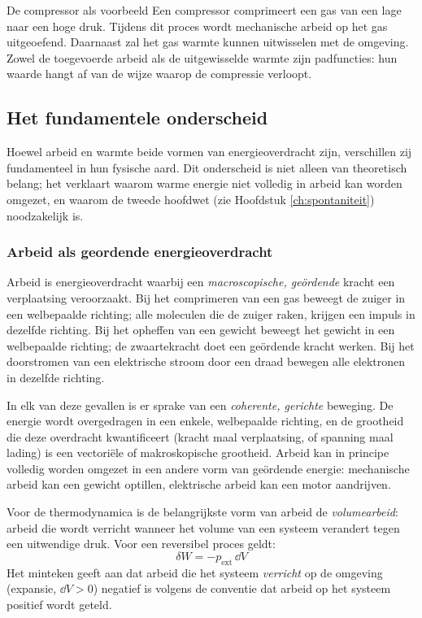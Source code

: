 \begin{toepassing}{De compressor als voorbeeld}
Een compressor comprimeert een gas van een lage naar een hoge druk. Tijdens dit proces wordt mechanische arbeid op het gas uitgeoefend. Daarnaast zal het gas warmte kunnen uitwisselen met de omgeving. Zowel de toegevoerde arbeid als de uitgewisselde warmte zijn padfuncties: hun waarde hangt af van de wijze waarop de compressie verloopt.
\end{toepassing}

\subsection{Het fundamentele onderscheid}

Hoewel arbeid en warmte beide vormen van energieoverdracht zijn, verschillen zij fundamenteel in hun fysische aard. Dit onderscheid is niet alleen van theoretisch belang; het verklaart waarom warme energie niet volledig in arbeid kan worden omgezet, en waarom de tweede hoofdwet (zie Hoofdstuk \ref{ch:spontaniteit}) noodzakelijk is.

\subsubsection{Arbeid als geordende energieoverdracht}

Arbeid is energieoverdracht waarbij een \emph{macroscopische, ge\"ordende} kracht een verplaatsing veroorzaakt. Bij het comprimeren van een gas beweegt de zuiger in een welbepaalde richting; alle moleculen die de zuiger raken, krijgen een impuls in dezelfde richting. Bij het opheffen van een gewicht beweegt het gewicht in een welbepaalde richting; de zwaartekracht doet een ge\"ordende kracht werken. Bij het doorstromen van een elektrische stroom door een draad bewegen alle elektronen in dezelfde richting.

In elk van deze gevallen is er sprake van een \emph{coherente, gerichte} beweging. De energie wordt overgedragen in een enkele, welbepaalde richting, en de grootheid die deze overdracht kwantificeert (kracht maal verplaatsing, of spanning maal lading) is een vectoriële of makroskopische grootheid. Arbeid kan in principe volledig worden omgezet in een andere vorm van ge\"ordende energie: mechanische arbeid kan een gewicht optillen, elektrische arbeid kan een motor aandrijven.

Voor de thermodynamica is de belangrijkste vorm van arbeid de \emph{volumearbeid}: arbeid die wordt verricht wanneer het volume van een systeem verandert tegen een uitwendige druk. Voor een reversibel proces geldt:
\begin{equation}
\boxed{\;\delta W = -p_{\text{ext}}\,\dd V\;}
\end{equation}
Het minteken geeft aan dat arbeid die het systeem \emph{verricht} op de omgeving (expansie, $\dd V > 0$) negatief is volgens de conventie dat arbeid op het systeem positief wordt geteld.


